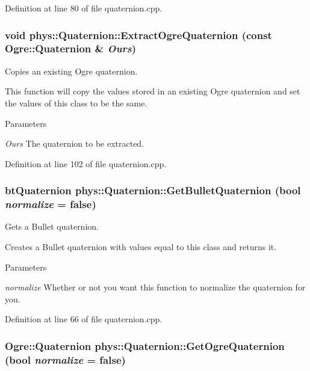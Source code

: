 Definition at line 80 of file quaternion.cpp.

\hypertarget{classphys_1_1Quaternion_a942fab675a0b124e1dc5e2febab113e6}{
\subsubsection[{ExtractOgreQuaternion}]{\setlength{\rightskip}{0pt plus 5cm}void phys::Quaternion::ExtractOgreQuaternion (const Ogre::Quaternion \& {\em Ours})}}
\label{df/d8c/classphys_1_1Quaternion_a942fab675a0b124e1dc5e2febab113e6}


Copies an existing Ogre quaternion. 

This function will copy the values stored in an existing Ogre quaternion and set the values of this class to be the same. 
\begin{DoxyParams}{Parameters}
\item[{\em Ours}]The quaternion to be extracted. \end{DoxyParams}


Definition at line 102 of file quaternion.cpp.

\hypertarget{classphys_1_1Quaternion_a30944ae1fe905ee4f5c946c9a0b354f7}{
\subsubsection[{GetBulletQuaternion}]{\setlength{\rightskip}{0pt plus 5cm}btQuaternion phys::Quaternion::GetBulletQuaternion (bool {\em normalize} = {\ttfamily false})}}
\label{df/d8c/classphys_1_1Quaternion_a30944ae1fe905ee4f5c946c9a0b354f7}


Gets a Bullet quaternion. 

Creates a Bullet quaternion with values equal to this class and returns it. 
\begin{DoxyParams}{Parameters}
\item[{\em normalize}]Whether or not you want this function to normalize the quaternion for you. \end{DoxyParams}


Definition at line 66 of file quaternion.cpp.

\hypertarget{classphys_1_1Quaternion_ad7501687205092c203d2358ca53d3bfe}{
\subsubsection[{GetOgreQuaternion}]{\setlength{\rightskip}{0pt plus 5cm}Ogre::Quaternion phys::Quaternion::GetOgreQuaternion (bool {\em normalize} = {\ttfamily false})}}
\label{df/d8c/classphys_1_1Quaternion_ad7501687205092c203d2358ca53d3bfe}


